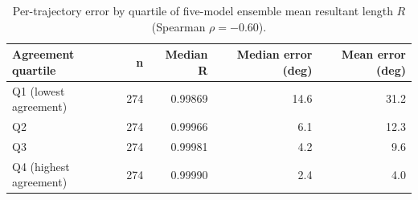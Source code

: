 \begin{table}[h!]
    \centering
    \caption{Per-trajectory error by quartile of five-model ensemble mean resultant length $R$ (Spearman $\rho=-0.60$).}
    \label{tab:calibration}
    \begin{tabular}{@{}lrrrr@{}}
        \toprule
        Agreement quartile & n & Median R & Median error (deg) & Mean error (deg) \\
        \midrule
        Q1 (lowest agreement) & 274 & 0.99869 & 14.6 & 31.2 \\
        Q2 & 274 & 0.99966 & 6.1 & 12.3 \\
        Q3 & 274 & 0.99981 & 4.2 & 9.6 \\
        Q4 (highest agreement) & 274 & 0.99990 & 2.4 & 4.0 \\
        \bottomrule
    \end{tabular}
\end{table}
